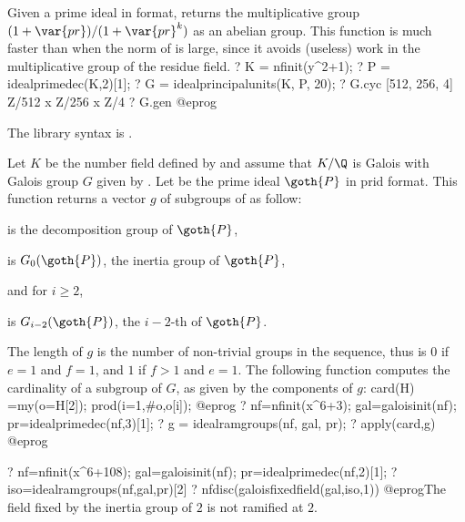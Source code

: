\label{se:idealprincipalunits}
Given a prime ideal in  format,
returns the multiplicative group $(1 + \var{pr}) / (1 + \var{pr}^k)$ as an
abelian group. This function is much faster than  when the
norm of  is large, since it avoids (useless) work in the
multiplicative group of the residue field.
\bprog
? K = nfinit(y^2+1);
? P = idealprimedec(K,2)[1];
? G = idealprincipalunits(K, P, 20);
? G.cyc
[512, 256, 4]   \\ Z/512 x Z/256 x Z/4
? G.gen
@eprog

The library syntax is .

\label{se:idealramgroups}
Let $K$ be the number field defined by  and assume that $K/\Q$ is
Galois with Galois group $G$ given by .
Let  be the prime ideal $\goth{P}$ in prid format.
This function returns a vector $g$ of subgroups of 
as follow:

\item {} is the decomposition group of $\goth{P}$,

\item {} is $G_0(\goth{P})$, the inertia group of $\goth{P}$,

and for $i\geq 2$,

\item {} is $G_{i-2}(\goth{P})$, the $i-2$-th  of $\goth{P}$.

\noindent The length of $g$ is the number of non-trivial groups in the
sequence, thus is $0$ if $e=1$ and $f=1$, and $1$ if $f>1$ and $e=1$.
The following function computes the cardinality of a subgroup of $G$,
as given by the components of $g$:
\bprog
card(H) =my(o=H[2]); prod(i=1,#o,o[i]);
@eprog
\bprog
? nf=nfinit(x^6+3); gal=galoisinit(nf); pr=idealprimedec(nf,3)[1];
? g = idealramgroups(nf, gal, pr);
? apply(card,g)
@eprog

\bprog
? nf=nfinit(x^6+108); gal=galoisinit(nf); pr=idealprimedec(nf,2)[1];
? iso=idealramgroups(nf,gal,pr)[2]
? nfdisc(galoisfixedfield(gal,iso,1))
@eprog\noindent The field fixed by the inertia group of $2$ is not ramified at
$2$.


